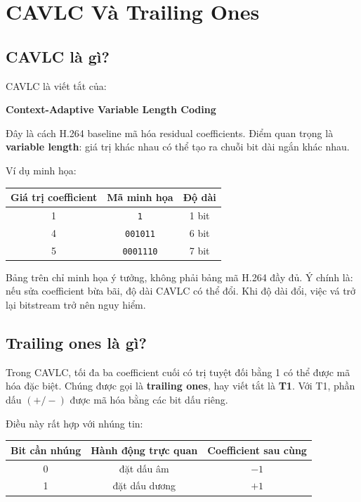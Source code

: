 \documentclass[11pt,a4paper]{article}
\begin{document}
\section{CAVLC Và Trailing Ones}

\subsection{CAVLC là gì?}

CAVLC là viết tắt của:

\begin{center}
\textbf{Context-Adaptive Variable Length Coding}
\end{center}

Đây là cách H.264 baseline mã hóa residual coefficients. Điểm quan trọng là
\textbf{variable length}: giá trị khác nhau có thể tạo ra chuỗi bit dài ngắn
khác nhau.

Ví dụ minh họa:

\begin{center}
\begin{tabular}{ccc}
\toprule
Giá trị coefficient & Mã minh họa & Độ dài \\
\midrule
1 & \texttt{1} & 1 bit \\
4 & \texttt{001011} & 6 bit \\
5 & \texttt{0001110} & 7 bit \\
\bottomrule
\end{tabular}
\end{center}

Bảng trên chỉ minh họa ý tưởng, không phải bảng mã H.264 đầy đủ. Ý chính là:
nếu sửa coefficient bừa bãi, độ dài CAVLC có thể đổi. Khi độ dài đổi, việc vá
trở lại bitstream trở nên nguy hiểm.

\subsection{Trailing ones là gì?}

Trong CAVLC, tối đa ba coefficient cuối có trị tuyệt đối bằng 1 có thể được mã
hóa đặc biệt. Chúng được gọi là \textbf{trailing ones}, hay viết tắt là
\textbf{T1}. Với T1, phần dấu \((+/-)\) được mã hóa bằng các bit dấu riêng.

Điều này rất hợp với nhúng tin:

\begin{center}
\begin{tabular}{ccc}
\toprule
Bit cần nhúng & Hành động trực quan & Coefficient sau cùng \\
\midrule
0 & đặt dấu âm & \(-1\) \\
1 & đặt dấu dương & \(+1\) \\
\bottomrule
\end{tabular}
\end{center}
\end{document}
